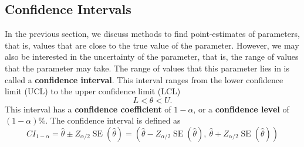 \documentclass{article}
\begin{document}
\subsection{Confidence Intervals}
In the previous section, we discuss methods to find point-estimates of
parameters, that is, values that are close to the true value of the
parameter. However, we may also be interested in the uncertainty of the
parameter, that is, the range of values that the parameter may take.
The range of values that this parameter lies in is called a
\textbf{confidence interval}. This interval ranges from the lower
confidence limit (UCL) to the upper confidence limit (LCL)
\begin{equation*}
    L < \theta < U.
\end{equation*}
This interval has a \textbf{confidence coefficient} of \(1 - \alpha\), or a \textbf{confidence level} of \(\left( 1 - \alpha \right)\%\).
The confidence interval is defined as
\begin{equation*}{CI}_{1 - \alpha} = \hat{\theta} \pm Z_{\alpha / 2} \operatorname{SE}\left( \hat{\theta} \right) = \left( \hat{\theta} - Z_{\alpha / 2} \operatorname{SE}\left( \hat{\theta} \right),\: \hat{\theta} + Z_{\alpha / 2} \operatorname{SE}\left( \hat{\theta} \right) \right)
\end{equation*}
\end{document}
